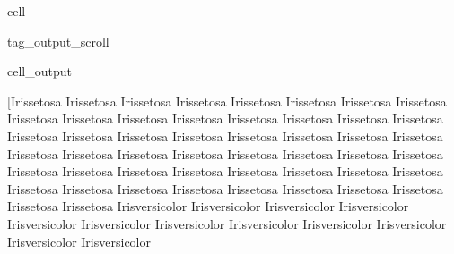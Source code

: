 \documentclass[letterpaper,10pt,english]{jupyterBook}
\begin{document}
\begin{sphinxuseclass}{cell}
\begin{sphinxuseclass}{tag_output_scroll}
\begin{sphinxVerbatimOutput}
\begin{sphinxuseclass}{cell_output}
\begin{sphinxVerbatim}[commandchars=\\\{\}]
[\PYGZsq{}Iris\PYGZhy{}setosa\PYGZsq{} \PYGZsq{}Iris\PYGZhy{}setosa\PYGZsq{} \PYGZsq{}Iris\PYGZhy{}setosa\PYGZsq{} \PYGZsq{}Iris\PYGZhy{}setosa\PYGZsq{} \PYGZsq{}Iris\PYGZhy{}setosa\PYGZsq{}
 \PYGZsq{}Iris\PYGZhy{}setosa\PYGZsq{} \PYGZsq{}Iris\PYGZhy{}setosa\PYGZsq{} \PYGZsq{}Iris\PYGZhy{}setosa\PYGZsq{} \PYGZsq{}Iris\PYGZhy{}setosa\PYGZsq{} \PYGZsq{}Iris\PYGZhy{}setosa\PYGZsq{}
 \PYGZsq{}Iris\PYGZhy{}setosa\PYGZsq{} \PYGZsq{}Iris\PYGZhy{}setosa\PYGZsq{} \PYGZsq{}Iris\PYGZhy{}setosa\PYGZsq{} \PYGZsq{}Iris\PYGZhy{}setosa\PYGZsq{} \PYGZsq{}Iris\PYGZhy{}setosa\PYGZsq{}
 \PYGZsq{}Iris\PYGZhy{}setosa\PYGZsq{} \PYGZsq{}Iris\PYGZhy{}setosa\PYGZsq{} \PYGZsq{}Iris\PYGZhy{}setosa\PYGZsq{} \PYGZsq{}Iris\PYGZhy{}setosa\PYGZsq{} \PYGZsq{}Iris\PYGZhy{}setosa\PYGZsq{}
 \PYGZsq{}Iris\PYGZhy{}setosa\PYGZsq{} \PYGZsq{}Iris\PYGZhy{}setosa\PYGZsq{} \PYGZsq{}Iris\PYGZhy{}setosa\PYGZsq{} \PYGZsq{}Iris\PYGZhy{}setosa\PYGZsq{} \PYGZsq{}Iris\PYGZhy{}setosa\PYGZsq{}
 \PYGZsq{}Iris\PYGZhy{}setosa\PYGZsq{} \PYGZsq{}Iris\PYGZhy{}setosa\PYGZsq{} \PYGZsq{}Iris\PYGZhy{}setosa\PYGZsq{} \PYGZsq{}Iris\PYGZhy{}setosa\PYGZsq{} \PYGZsq{}Iris\PYGZhy{}setosa\PYGZsq{}
 \PYGZsq{}Iris\PYGZhy{}setosa\PYGZsq{} \PYGZsq{}Iris\PYGZhy{}setosa\PYGZsq{} \PYGZsq{}Iris\PYGZhy{}setosa\PYGZsq{} \PYGZsq{}Iris\PYGZhy{}setosa\PYGZsq{} \PYGZsq{}Iris\PYGZhy{}setosa\PYGZsq{}
 \PYGZsq{}Iris\PYGZhy{}setosa\PYGZsq{} \PYGZsq{}Iris\PYGZhy{}setosa\PYGZsq{} \PYGZsq{}Iris\PYGZhy{}setosa\PYGZsq{} \PYGZsq{}Iris\PYGZhy{}setosa\PYGZsq{} \PYGZsq{}Iris\PYGZhy{}setosa\PYGZsq{}
 \PYGZsq{}Iris\PYGZhy{}setosa\PYGZsq{} \PYGZsq{}Iris\PYGZhy{}setosa\PYGZsq{} \PYGZsq{}Iris\PYGZhy{}setosa\PYGZsq{} \PYGZsq{}Iris\PYGZhy{}setosa\PYGZsq{} \PYGZsq{}Iris\PYGZhy{}setosa\PYGZsq{}
 \PYGZsq{}Iris\PYGZhy{}setosa\PYGZsq{} \PYGZsq{}Iris\PYGZhy{}setosa\PYGZsq{} \PYGZsq{}Iris\PYGZhy{}setosa\PYGZsq{} \PYGZsq{}Iris\PYGZhy{}setosa\PYGZsq{} \PYGZsq{}Iris\PYGZhy{}setosa\PYGZsq{}
 \PYGZsq{}Iris\PYGZhy{}versicolor\PYGZsq{} \PYGZsq{}Iris\PYGZhy{}versicolor\PYGZsq{} \PYGZsq{}Iris\PYGZhy{}versicolor\PYGZsq{} \PYGZsq{}Iris\PYGZhy{}versicolor\PYGZsq{}
 \PYGZsq{}Iris\PYGZhy{}versicolor\PYGZsq{} \PYGZsq{}Iris\PYGZhy{}versicolor\PYGZsq{} \PYGZsq{}Iris\PYGZhy{}versicolor\PYGZsq{} \PYGZsq{}Iris\PYGZhy{}versicolor\PYGZsq{}
 \PYGZsq{}Iris\PYGZhy{}versicolor\PYGZsq{} \PYGZsq{}Iris\PYGZhy{}versicolor\PYGZsq{} \PYGZsq{}Iris\PYGZhy{}versicolor\PYGZsq{} \PYGZsq{}Iris\PYGZhy{}versicolor\PYGZsq{}

\end{sphinxVerbatim}
\end{sphinxuseclass}
\end{sphinxVerbatimOutput}
\end{sphinxuseclass}
\end{sphinxuseclass}
\end{document}
